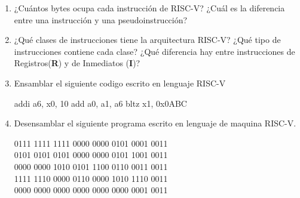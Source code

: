 \begin{enunciado}{\ejercicio}
    \begin{enumerate}
            \item ¿Cuántos bytes ocupa cada instrucción de RISC-V? ¿Cuál es la diferencia entre una
                    instrucción y una pseudoinstrucción?

        \item ¿Qué clases de instrucciones tiene la arquitectura RISC-V? ¿Qué tipo de instrucciones 
        contiene cada clase? ¿Qué diferencia hay entre instrucciones de Registros(\textbf{R}) y de Inmediatos
        (\textbf{I})?

        \item Ensamblar el siguiente codigo escrito en lenguaje RISC-V
        
        \begin{riscv}
    addi a6, x0, 10
    add a0, a1, a6
    bltz x1, 0x0ABC        
        \end{riscv}

        \item Desensamblar el siguiente programa escrito en lenguaje de maquina RISC-V.

        \begin{center}
            0111 1111 1111 0000 0000 0101 0001 0011 \\
            0101 0101 0101 0000 0000 0101 1001 0011 \\
            0000 0000 1010 0101 1100 0110 0011 0011 \\
            1111 1110 0000 0110 0000 1010 1110 0011 \\
            0000 0000 0000 0000 0000 0000 0001 0011 \\
        \end{center}
    \end{enumerate}
    \end{enunciado}

